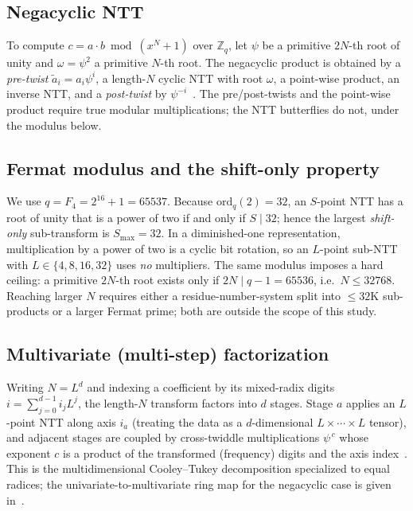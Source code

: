 \documentclass[conference]{IEEEtran}
\begin{document}
\subsection{Negacyclic NTT}
To compute $c=a\cdot b \bmod (x^{N}+1)$ over $\mathbb{Z}_q$, let $\psi$ be a
primitive $2N$-th root of unity and $\omega=\psi^{2}$ a primitive $N$-th root.
The negacyclic product is obtained by a \emph{pre-twist} $\tilde a_i=a_i\psi^{i}$,
a length-$N$ cyclic NTT with root $\omega$, a point-wise product, an inverse NTT,
and a \emph{post-twist} by $\psi^{-i}$~\cite{longa2016}. The pre/post-twists and
the point-wise product require true modular multiplications; the NTT butterflies
do not, under the modulus below.

\subsection{Fermat modulus and the shift-only property}
We use $q=F_4=2^{16}+1=65537$. Because $\mathrm{ord}_q(2)=32$, an $S$-point NTT
has a root of unity that is a power of two if and only if $S\mid 32$; hence the
largest \emph{shift-only} sub-transform is $S_{\max}=32$. In a diminished-one
representation, multiplication by a power of two is a cyclic bit rotation, so an
$L$-point sub-NTT with $L\in\{4,8,16,32\}$ uses \emph{no} multipliers. The same
modulus imposes a hard ceiling: a primitive $2N$-th root exists only if
$2N\mid q-1=65536$, i.e.\ $N\le 32768$. Reaching larger $N$ requires either a
residue-number-system split into $\le\!32$K sub-products or a larger Fermat prime;
both are outside the scope of this study.

\subsection{Multivariate (multi-step) factorization}
Writing $N=L^{d}$ and indexing a coefficient by its mixed-radix digits
$i=\sum_{j=0}^{d-1} i_j L^{j}$, the length-$N$ transform factors into $d$ stages.
Stage $a$ applies an $L$-point NTT along axis $i_a$ (treating the data as a
$d$-dimensional $L\times\cdots\times L$ tensor), and adjacent stages are coupled
by cross-twiddle multiplications $\psi^{\,c}$ whose exponent $c$ is a product of
the transformed (frequency) digits and the axis index~\cite{bailey1990,
kim2024fermat}. This is the multidimensional Cooley--Tukey decomposition
specialized to equal radices; the univariate-to-multivariate ring map for the
negacyclic case is given in~\cite{kim2024fermat}.

\end{document}
